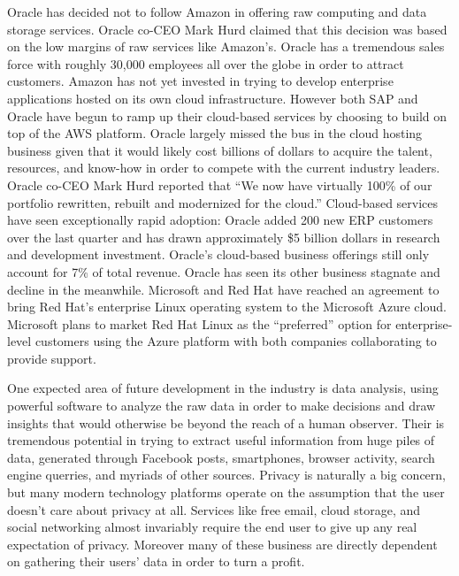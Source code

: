 Oracle has decided not to follow Amazon in offering raw computing and data storage services.
Oracle co-CEO Mark Hurd claimed that this decision was based on the low margins of raw services like Amazon's.\autocite[]{OracleCloudNotAWS}
Oracle has a tremendous sales force with roughly 30,000 employees all over the globe in order to attract customers.\autocite[]{OracleCloudNotAWS}
Amazon has not yet invested in trying to develop enterprise applications hosted on its own cloud infrastructure.
However both SAP and Oracle have begun to ramp up their cloud-based services by choosing to build on top of the AWS platform.\autocite[]{OracleCloudNotAWS}
Oracle largely missed the bus in the cloud hosting business given that it would likely cost billions of dollars to acquire the talent, resources, and know-how in order to compete with the current industry leaders.\autocite[]{OracleCloudNotAWS}
Oracle co-CEO Mark Hurd reported that ``We now have virtually 100\% of our portfolio rewritten, rebuilt and modernized for the cloud.''\autocite[]{OracleRebuilt}
Cloud-based services have seen exceptionally rapid adoption: Oracle added 200 new ERP customers over the last quarter and has drawn approximately \$5 billion dollars in research and development investment.\autocite[]{OracleRebuilt}
Oracle's cloud-based business offerings still only account for 7\% of total revenue.\autocite[]{OracleNoGrowth}
Oracle has seen its other business stagnate and decline in the meanwhile.\autocite[]{OracleNoGrowth}
Microsoft and Red Hat have reached an agreement to bring Red Hat's enterprise Linux operating system to the Microsoft Azure cloud.\autocite[]{MSRHTDeal}
Microsoft plans to market Red Hat Linux as the ``preferred'' option for enterprise-level customers using the Azure platform with both companies collaborating to provide support.\autocite[]{MSRHTDeal}

One expected area of future development in the industry is data analysis, using powerful software to analyze the raw data in order to make decisions and draw insights that would otherwise be beyond the reach of a human observer.\autocite[]{NextGenBusinessSoftware}
Their is tremendous potential in trying to extract useful information from huge piles of data, generated through Facebook posts, smartphones, browser activity, search engine querries, and myriads of other sources.\autocite[]{NextGenBusinessSoftware}
Privacy is naturally a big concern, but many modern technology platforms operate on the assumption that the user doesn't care about privacy at all.
Services like free email, cloud storage, and social networking almost invariably require the end user to give up any real expectation of privacy.
Moreover many of these business are directly dependent on gathering their users' data in order to turn a profit.\autocite[]{NextGenBusinessSoftware}
